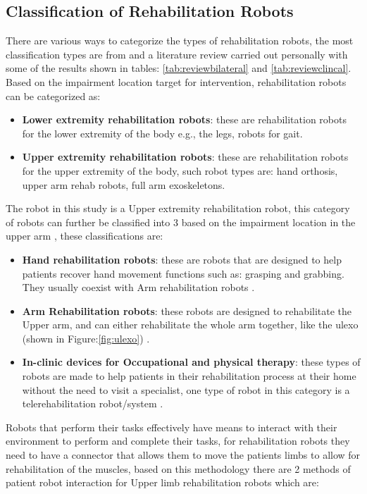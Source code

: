 \subsection{Classification of Rehabilitation Robots}
There are various ways to categorize the types of rehabilitation robots, the most classification types are from \cite{Sheng2016} and a literature review carried out personally with some of the results shown in tables: \ref{tab:reviewbilateral} and \ref{tab:reviewclincal}.\\
Based on the impairment location target for intervention, rehabilitation robots can be categorized as:
\begin{itemize}%
	\item \textbf{Lower extremity rehabilitation robots}: these are rehabilitation robots for the lower extremity of the body e.g., the legs, robots for gait.
	\item \textbf{Upper extremity rehabilitation robots}: these are rehabilitation robots for the upper extremity of the body, such robot types are: hand orthosis, upper arm rehab robots, full arm exoskeletons. 
\end{itemize}
The robot in this study is a Upper extremity rehabilitation robot, this category of robots can further be classified into 3 based on the impairment location in the upper arm \cite{Sheng2016}, these classifications are: 
\begin{itemize}%
	\item \textbf{Hand rehabilitation robots}: these are robots that are designed to help patients recover hand movement functions such as: grasping and grabbing. They usually coexist with Arm rehabilitation robots \cite{Troncossi2016}.
	\item \textbf{Arm Rehabilitation robots}: these robots are designed to rehabilitate the Upper arm, and can either rehabilitate the whole arm together, like the \ac{ulexo} (shown in Figure:\ref{fig:ulexo}) \cite{Shen2019a,Simkins2016}.
	\item \textbf{In-clinic devices for Occupational and physical therapy}: these types of robots are made to help patients in their rehabilitation process at their home without the need to visit a specialist, one type of robot in this category is a telerehabilitation robot/system \cite{Song2016,Carignan2006,Laut2016,Sheng2016}.
\end{itemize}
Robots that perform their tasks effectively have means to interact with their environment to perform and complete their tasks, for rehabilitation robots they need to have a connector that allows them to move the patients limbs to allow for rehabilitation of the muscles, based on this methodology there are 2 methods of patient robot interaction for Upper limb rehabilitation robots which are:
